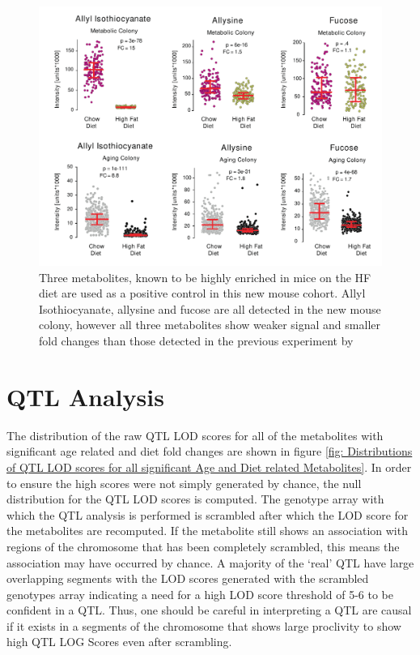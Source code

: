 \documentclass[a4paper,11pt,twoside]{book}
\begin{document}
\begin{figure}[t!]
		\centering
		\includegraphics[width=\linewidth]{3.Metabolomics/Top_3_Diet_Metabolites}
		\caption{ Three metabolites, known to be highly enriched in mice on the HF diet are used as a positive control in this new mouse cohort. Allyl Isothiocyanate, allysine and fucose are all detected in the new mouse colony, however all three metabolites show weaker signal and smaller fold changes than those detected in the previous experiment by \citeauthor{Williams2016SystemsFunction}}
		\label{fig:Top 3 Diet Metabolites}
\end{figure}
	

\section{QTL Analysis}
	
	The distribution of the raw QTL LOD scores for all of the metabolites with significant age related and diet fold changes are shown in figure \ref{fig: Distributions of QTL LOD scores for all significant Age and Diet related Metabolites}.  In order to ensure the high scores were not simply generated by chance, the null distribution for the QTL LOD scores is computed. The genotype array with which the QTL analysis is performed is scrambled after which the LOD score for the metabolites are recomputed. If the metabolite still shows an association with  regions of the chromosome that has been completely scrambled, this means the association may have occurred by chance. A majority of the ‘real’ QTL have large overlapping segments with the LOD scores generated with the scrambled genotypes array indicating a need for a high LOD score threshold of 5-6 to be confident in a QTL. Thus, one should be careful in interpreting a QTL are causal if it exists in a segments of the chromosome that shows large proclivity to show high QTL LOG Scores even after scrambling. 
	
\end{document}
